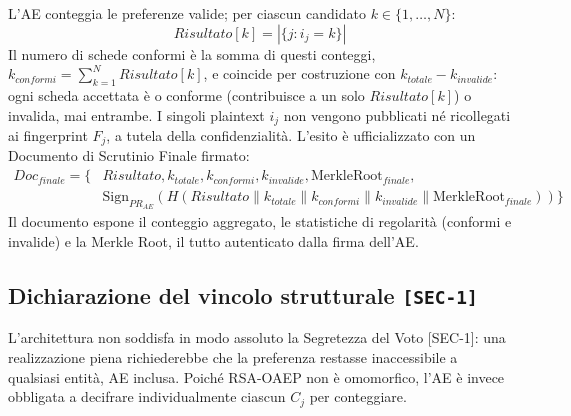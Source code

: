 L'AE conteggia le preferenze valide; per ciascun candidato $k \in \{1, \dots, N\}$:
$$Risultato[k] = |\{j : i_j = k\}|$$
Il numero di schede conformi è la somma di questi conteggi, $k_{conformi} = \sum_{k=1}^{N} Risultato[k]$, e coincide per costruzione con $k_{totale} - k_{invalide}$: ogni scheda accettata è o conforme (contribuisce a un solo $Risultato[k]$) o invalida, mai entrambe. I singoli plaintext $i_j$ non vengono pubblicati né ricollegati ai fingerprint $F_j$, a tutela della confidenzialità. L'esito è ufficializzato con un Documento di Scrutinio Finale firmato:
\begin{equation*}
\begin{split}
Doc_{finale} = \{ & Risultato, k_{totale}, k_{conformi}, k_{invalide}, \text{MerkleRoot}_{finale}, \\
& \text{Sign}_{PR_{AE}}(H(Risultato \parallel k_{totale} \parallel k_{conformi} \parallel k_{invalide} \parallel \text{MerkleRoot}_{finale})) \}
\end{split}
\end{equation*}
Il documento espone il conteggio aggregato, le statistiche di regolarità (conformi e invalide) e la Merkle Root, il tutto autenticato dalla firma dell'AE.

\subsection{Dichiarazione del vincolo strutturale \texttt{[SEC-1]}}
\label{subsec:wp2_limite_sec1}

L'architettura non soddisfa in modo assoluto la Segretezza del Voto [SEC-1]: una realizzazione piena richiederebbe che la preferenza restasse inaccessibile a qualsiasi entità, AE inclusa. Poiché RSA-OAEP non è omomorfico, l'AE è invece obbligata a decifrare individualmente ciascun $C_j$ per conteggiare.

